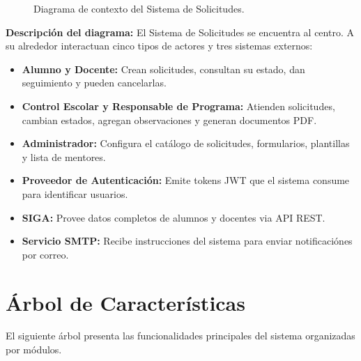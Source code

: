 \begin{figure}[H]
\caption{Diagrama de contexto del Sistema de Solicitudes.}
\label{fig:contexto}
\end{figure}

\textbf{Descripción del diagrama:} El Sistema de Solicitudes se encuentra al centro. A su alrededor interactuan cinco tipos de actores y tres sistemas externos:

\begin{itemize}
    \item \textbf{Alumno y Docente:} Crean solicitudes, consultan su estado, dan seguimiento y pueden cancelarlas.
    \item \textbf{Control Escolar y Responsable de Programa:} Atienden solicitudes, cambian estados, agregan observaciones y generan documentos PDF.
    \item \textbf{Administrador:} Configura el catálogo de solicitudes, formularios, plantillas y lista de mentores.
    \item \textbf{Proveedor de Autenticación:} Emite tokens JWT que el sistema consume para identificar usuarios.
    \item \textbf{SIGA:} Provee datos completos de alumnos y docentes via API REST.
    \item \textbf{Servicio SMTP:} Recibe instrucciones del sistema para enviar notificaciónes por correo.
\end{itemize}

\section{Árbol de Características}

El siguiente árbol presenta las funcionalidades principales del sistema organizadas por módulos.

